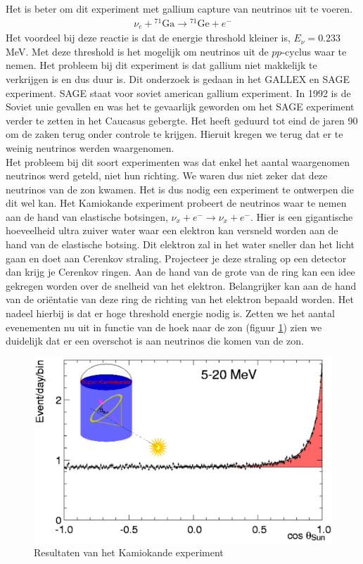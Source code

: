 \documentclass[../main.tex]{subfiles}
\begin{document}
Het is beter om dit experiment met gallium capture van neutrinos uit te voeren.
\begin{equation}
    \begin{aligned}
        \label{eq:ga_neutrino_capture}
        \nu_{e}+{ }^{71} \mathrm{Ga} \rightarrow{ }^{71} \mathrm{Ge}+e^{-}
    \end{aligned}
\end{equation}
Het voordeel bij deze reactie is dat de energie threshold kleiner is, $E_\nu = 0.233$MeV. Met deze threshold is het mogelijk om neutrinos uit de $pp$-cyclus waar te nemen. Het probleem bij dit experiment is dat gallium niet makkelijk te verkrijgen is en dus duur is. Dit onderzoek is gedaan in het GALLEX en SAGE experiment. SAGE staat voor soviet american gallium experiment. In 1992 is de Soviet unie gevallen en was het te gevaarlijk geworden om het SAGE experiment verder te zetten in het Caucasus gebergte. Het heeft geduurd tot eind  de jaren 90 om de zaken terug onder controle te krijgen. Hieruit kregen we terug dat er te weinig neutrinos werden waargenomen.\\
Het probleem bij dit soort experimenten was dat enkel het aantal waargenomen neutrinos werd geteld, niet hun richting. We waren dus niet zeker dat deze neutrinos van de zon kwamen. Het is dus nodig een experiment te ontwerpen die dit wel kan. Het Kamiokande experiment probeert de neutrinos waar te nemen aan de hand van elastische botsingen, $\nu_{x}+e^{-} \rightarrow \nu_{x}+e^{-}$. Hier is een gigantische hoeveelheid ultra zuiver water waar een elektron kan versneld worden aan de hand van de elastische botsing. Dit elektron zal in het water sneller dan het licht gaan en doet aan Cerenkov straling. Projecteer je deze straling op een detector dan krijg je Cerenkov ringen. Aan de hand van de grote van de ring kan een idee gekregen worden over de snelheid van het elektron. Belangrijker kan aan de hand van de oriëntatie van deze ring de richting van het elektron bepaald worden. Het nadeel hierbij is dat er hoge threshold energie nodig is. Zetten we het aantal evenementen nu uit in functie van de hoek naar de zon (figuur \ref{fig:neutrinos/kamiokande_results}) zien we duidelijk dat er een overschot is aan neutrinos die komen van de zon.

\begin{figure}[h]
    \centering
    \includegraphics[width=0.5\linewidth]{neutrinos/kamiokande_results.png}
    \caption{Resultaten van het Kamiokande experiment}%
    \label{fig:neutrinos/kamiokande_results}
\end{figure}
\end{document}
